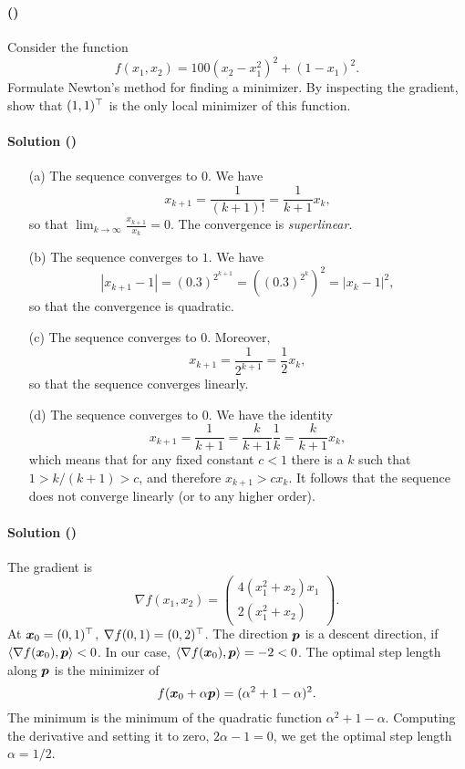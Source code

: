 \documentclass{article}
\newcounter{problems}
\renewcommand{\problem}[1]{\paragraph{(\theproblems)}\addtocounter{problems}{1}\label{#1}}
\newcommand{\marks}[2][0mm]{\hspace{30mm}\mbox{}\vskip #1\hspace{-30mm}\hfill{\sf [#2 marks]}\\[-\baselineskip]}
\renewcommand{\marks}[2][0mm]{\hspace{30mm}\mbox{}\vskip #1\hspace{-30mm}\hfill{\sf [#2 marks]}\\[-\baselineskip]}
\renewcommand{\solution}[1]{\paragraph{Solution (\theproblems)}\addtocounter{problems}{1}\label{#1}}
\begin{document}
\marks[-6mm]{4} 

\problem{p4} Consider the function
\begin{equation*}
 f(x_1,x_2) = 100(x_2-x_1^2)^2+(1-x_1)^2.
\end{equation*}
Formulate Newton's method for finding a minimizer. By inspecting the gradient, show that $(1,1)^{\top}$ is the only local minimizer of this function.
\marks[-4mm]{4}

\newpage

\setcounter{problems}{0}

\solution{so1} 
\begin{itemize}
                \item[(a)] The sequence converges to $0$. We have
                \begin{equation*}
                 x_{k+1} = \frac{1}{(k+1)!} = \frac{1}{k+1} x_k,
                \end{equation*}
                so that $\lim_{k\to \infty} \frac{x_{k+1}}{x_k} = 0$. The convergence is {\em superlinear}.
\item[(b)] The sequence converges to $1$. We have
\begin{equation*}
 |x_{k+1}-1| = (0.3)^{2^{k+1}} = \left((0.3)^{2^{k}}\right)^2 = |x_k-1|^2,
\end{equation*}
so that the convergence is quadratic.
\item[(c)] The sequence converges to $0$. Moreover,
\begin{equation*}
 x_{k+1} = \frac{1}{2^{k+1}} = \frac{1}{2} x_k,
\end{equation*}
so that the sequence converges linearly.
\item[(d)] The sequence converges to $0$. We have the identity
\begin{equation*}
 x_{k+1} = \frac{1}{k+1} = \frac{k}{k+1} \frac{1}{k} = \frac{k}{k+1}x_k,
\end{equation*}
which means that for any fixed constant $c<1$ there is a $k$ such that $1>k/(k+1)>c$, and therefore $x_{k+1} > cx_k$. It follows that the sequence does not converge linearly (or to any higher order).
\end{itemize}

\solution{so2} The gradient is
\begin{equation*}
 \nabla f(x_1,x_2) = \begin{pmatrix}
                      4(x_1^2+x_2)x_1\\
                      2(x_1^2+x_2)
                     \end{pmatrix}.
\end{equation*}
At $\bm{x}_0=(0,1)^{\top}$, $\nabla f(0,1) = (0,2)^{\top}$. The direction $\bm{p}$ is a descent direction, if $\langle {\nabla f(\bm{x}_0)}, {\bm{p}} \rangle<0$. In our case,
$\langle {\nabla f(\bm{x}_0)}, {\bm{p}} \rangle = -2<0$.
The optimal step length along $\bm{p}$ is the minimizer of
\begin{equation*}
 f(\bm{x}_0+\alpha\bm{p}) = (\alpha^2+1-\alpha)^2.
\end{equation*}
The minimum is the minimum of the quadratic function $\alpha^2+1-\alpha$. Computing the derivative and setting it to zero, $2\alpha-1=0$, we get the optimal step length $\alpha=1/2$.
\end{document}
